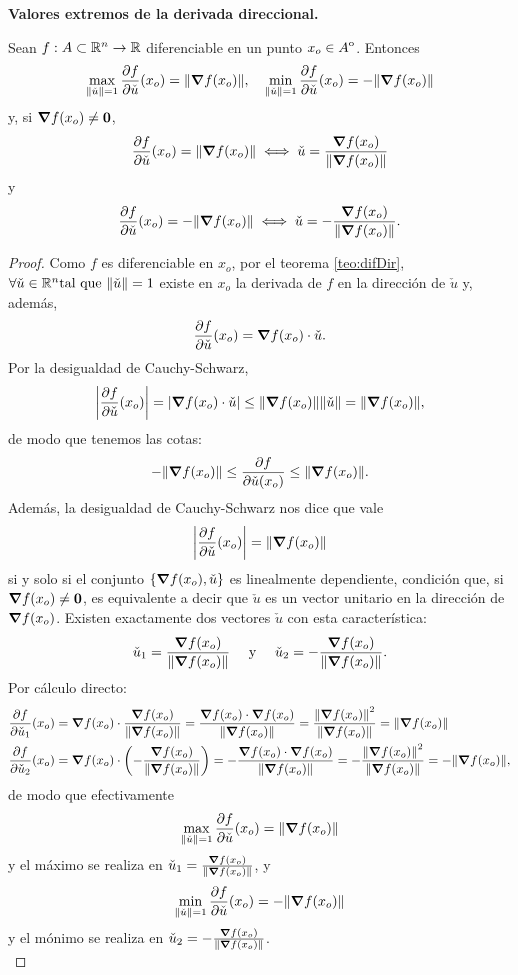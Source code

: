 
\begin{theorem}\textbf{Valores extremos de la derivada direccional.} \label{teo:max_deriv}
\mbox{}

 Sean $f: A \subset \mathbb{R}^n \to \mathbb{R}$ diferenciable en un punto $x_o \in {\kern0ptA}^{\mathrm{o}}$. Entonces 
 \[
  \max_{\norm{\check{u}} = 1} \frac{\partial f}{\partial \check{u}} (x_o) = \norm{\grad f (x_o)}, \quad 
  \min_{\norm{\check{u}} = 1} \frac{\partial f}{\partial \check{u}} (x_o) = -\norm{\grad f (x_o)}
 \]
y, si $\grad f(x_o) \ne \mathbf{0}$,
\[
 \frac{\partial f}{\partial \check{u}} (x_o) = \norm{\grad f (x_o)} \iff \check{u} = \frac{\grad f(x_o)}{\norm{\grad f(x_o)}}
\]
y
\[
 \frac{\partial f}{\partial \check{u}} (x_o) = -\norm{\grad f (x_o)} \iff \check{u} = -\frac{\grad f(x_o)}{\norm{\grad f(x_o)}}.
\]
\begin{proof}
\mbox{}

 Como $f$ es diferenciable en $x_o$, por el teorema \eqref{teo:difDir}, $\forall \check{u} \in \mathbb{R}^n \text{tal que } \norm{\check{u}} = 1$ existe en $x_o$ la derivada de $f$ en la direcci\'on de $\check{u}$ y, adem\'as,
\[
 \frac{\partial f}{\partial \check{u}} (x_o) = \grad f (x_o) \cdot \check{u}.
\]
Por la desigualdad de Cauchy-Schwarz, 
\[
 \abs{\frac{\partial f}{\partial \check{u}} (x_o)} = \abs{\grad f (x_o) \cdot \check{u}} \le \norm{\grad f (x_o)}\norm{\check{u}} = \norm{\grad f (x_o)},
\]
de modo que tenemos las cotas:
\[
 -\norm{\grad f (x_o)} \le \frac{\partial f}{\partial \check{u} (x_o)} \le \norm{\grad f (x_o)}.
\]
Adem\'as, la desigualdad de Cauchy-Schwarz nos dice que vale
\[
 \abs{\frac{\partial f}{\partial \check{u}} (x_o)} = \norm{\grad f (x_o)}
\]
si y solo si el conjunto $\{\grad f(x_o), \check{u} \}$ es linealmente dependiente, condici\'on que, si $\grad f(x_o) \ne \mathbf{0}$, es equivalente a decir que $\check{u}$ es un vector unitario en la direcci\'on de $\grad f(x_o)$. Existen exactamente dos vectores $\check{u}$ con esta caracter\'istica:
\[
 \check{u}_1 = \frac{\grad f(x_o)}{\norm{\grad f(x_o)}} \quad \text{ y } \quad \check{u}_2 = -\frac{\grad f(x_o)}{\norm{\grad f(x_o)}}.
\]
Por c\'alculo directo:
\begin{align*}
 \frac{\partial f}{\partial \check{u}_1} (x_o) &= \grad f (x_o) \cdot \frac{\grad f(x_o)}{\norm{\grad f(x_o)}} = \frac{ \grad f (x_o) \cdot \grad f(x_o) }{\norm{\grad f(x_o)}} = \frac{\norm{\grad f (x_o)}^2 }{\norm{\grad f(x_o)}} = \norm{\grad f (x_o)} \\
%  
 \frac{\partial f}{\partial \check{u}_2} (x_o) &= \grad f (x_o) \cdot \left( - \frac{\grad f(x_o)}{\norm{\grad f(x_o)}} \right) = -\frac{ \grad f (x_o) \cdot \grad f(x_o) }{\norm{\grad f(x_o)}} = -\frac{\norm{\grad f (x_o)}^2 }{\norm{\grad f(x_o)}} = -\norm{\grad f (x_o)},
\end{align*}
de modo que efectivamente
\[
 \max_{\norm{\check{u}}=1} \frac{\partial f}{\partial \check{u}} (x_o) = \norm{\grad f (x_o)}
\]
y el m\'aximo se realiza en $\check{u}_1 = \frac{\grad f(x_o)}{\norm{\grad f(x_o)}}$,
y
\[
 \min_{\norm{\check{u}}=1} \frac{\partial f}{\partial \check{u}} (x_o) = -\norm{\grad f (x_o)}
\]
y el m\'onimo se realiza en $\check{u}_2 = -\frac{\grad f(x_o)}{\norm{\grad f(x_o)}}$. \\


\end{proof}
\end{theorem}
